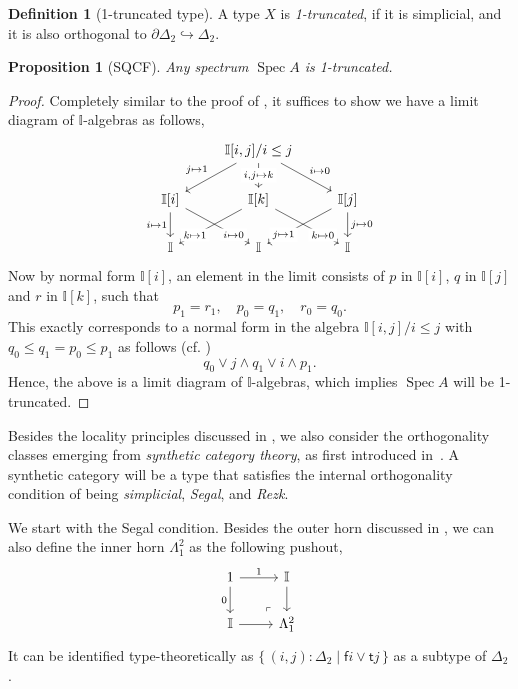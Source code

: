 \documentclass[12pt]{amsart}
\newtheorem{proposition}[theorem]{Proposition}
\theoremstyle{definition}
\newtheorem{definition}[theorem]{Definition}
\newcommand{\mbb}[1]{\mathbb{#1}}
\newcommand{\I}{\mbb I}
\newcommand{\ms}[1]{\mathsf{#1}}
\newcommand{\scomp}[2]{\{\,#1\mid#2\,\}}
\newcommand{\hook}{\hookrightarrow}
\newcommand{\spec}{\operatorname{Spec}}
\begin{document}
\begin{definition}[1-truncated type]
  A type $X$ is \emph{1-truncated}, if it is simplicial, and it is also orthogonal to $\partial\Delta_2 \hook \Delta_2$.
\end{definition}

\begin{proposition}[SQCF]\label{specis1t}
  Any spectrum $\spec A$ is 1-truncated.
\end{proposition}
\begin{proof}
  Completely similar to the proof of , it suffices to show we have a limit diagram of $\I$-algebras as follows,
  \[\begin{tikzcd}
    & {\I[i,j]/i\le j} \\
    \I[i] & \I[k] & \I[j] \\
    \I & \I & \I
    \arrow["{j \mapsto 1}"', from=1-2, to=2-1]
    \arrow["{i,j \mapsto k}"{description}, from=1-2, to=2-2]
    \arrow["{i \mapsto 0}", from=1-2, to=2-3]
    \arrow["i \mapsto 1"', from=2-1, to=3-1]
    \arrow["i \mapsto 0"{description, pos=0.75}, from=2-1, to=3-2]
    \arrow["k \mapsto 1"{description, pos=0.75}, from=2-2, to=3-1]
    \arrow["k \mapsto 0"{description, pos=0.75}, from=2-2, to=3-3]
    \arrow["j \mapsto 1"{description, pos=0.75}, from=2-3, to=3-2]
    \arrow["j \mapsto 0", from=2-3, to=3-3]
  \end{tikzcd}\]
  Now by normal form $\I[i]$, an element in the limit consists of $p$ in $\I[i]$, $q$ in $\I[j]$ and $r$ in $\I[k]$, such that
  \[ p_1 = r_1, \quad p_0 = q_1, \quad r_0 = q_0. \]
  This exactly corresponds to a normal form in the algebra $\I[i,j]/i\le j$ with $q_0 \le q_1 = p_0 \le p_1$ as follows (cf. )
  \[ q_0 \vee j \wedge q_1 \vee i \wedge p_1. \]
  Hence, the above is a limit diagram of $\I$-algebras, which implies $\spec A$ will be 1-truncated.
\end{proof}

Besides the locality principles discussed in , we also consider the orthogonality classes emerging from \emph{synthetic category theory}, as first introduced in~\cite{riehl2017type}. A synthetic category will be a type that satisfies the internal orthogonality condition of being \emph{simplicial}, \emph{Segal}, and \emph{Rezk}.

We start with the Segal condition. Besides the outer horn discussed in , we can also define the inner horn $\Lambda^2_1$ as the following pushout,
\[
  \begin{tikzcd}
    1 \ar[d, "0"'] \ar[r, "1"] & \I \ar[d] \\
    \I \ar[r] & \Lambda^2_1
    \arrow["\lrcorner"{anchor=center, pos=0.125, rotate=180}, draw=none, from=2-2, to=1-1]
  \end{tikzcd}
\]
It can be identified type-theoretically as $\scomp{(i,j) : \Delta_2}{\ms fi \vee \ms tj}$ as a subtype of $\Delta_2$.
\end{document}
